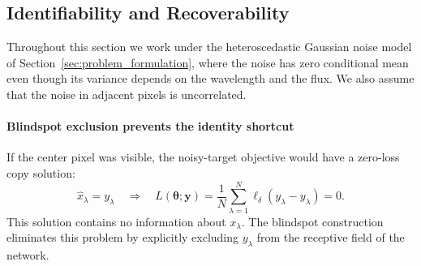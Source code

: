 \documentclass[twocolumn]{aastex7}
\newcommand{\algkey}[1]{\textcolor{BlindspotBlue}{\textbf{#1}}}
\newcommand{\m}[1]{\boldsymbol{#1}}
\newcounter{algorithm}
\renewcommand{\thealgorithm}{\arabic{algorithm}}
\newenvironment{algorithmblock}[1]{%
    \refstepcounter{algorithm}%
    \begin{tcolorbox}[
        colback=BlindspotBack,
        colframe=BlindspotBlue,
        coltitle=black,
        colbacktitle=BlindspotTitle,
        fonttitle=\bfseries,
        title={Algorithm~\thealgorithm. #1},
        boxrule=0.55pt,
        arc=2pt,
        left=0.8em,
        right=0.8em,
        top=0.45em,
        bottom=0.45em,
        before skip=0.8\baselineskip,
        after skip=0.8\baselineskip
    ]
    \small
}{%
    \end{tcolorbox}
}
\begin{document}

\subsection{Identifiability and Recoverability}
\label{sec:theory}

Throughout this section we work under the heteroscedastic Gaussian noise model of Section~\ref{sec:problem_formulation}, where the noise has zero conditional mean even though its variance depends on the wavelength and the flux. We also assume that the noise in adjacent pixels is uncorrelated.

\paragraph{Blindspot exclusion prevents the identity shortcut}
If the center pixel was visible, the noisy-target objective would have a zero-loss copy solution:
\begin{equation}
    \hat{x}_{\lambda}=y_{\lambda}
    \quad\Longrightarrow\quad
    L(\m{\theta};\m{y})
    = \frac{1}{N}\sum_{\lambda=1}^{N}
        \ell_{\delta}\!\left(y_{\lambda}-y_{\lambda}\right)
    =0.
\end{equation}
This solution contains no information about $x_{\lambda}$. The blindspot construction eliminates this problem by explicitly excluding $y_{\lambda}$ from the receptive field of the network.
\end{document}

